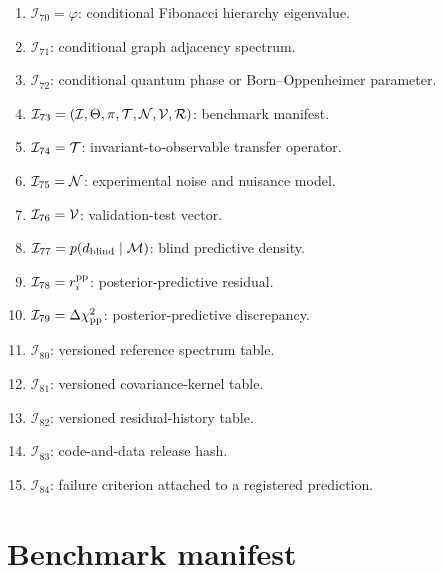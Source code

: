 \documentclass[
  aps,
  prd,
  reprint,
  superscriptaddress,
  nofootinbib,
  floatfix,
  longbibliography
]{revtex4-2}
\newcommand{\Inv}{\mathcal I}
\begin{document}
\begin{enumerate}
\item \(\Inv_{70}=\varphi\): conditional Fibonacci hierarchy eigenvalue.
\item \(\Inv_{71}\): conditional graph adjacency spectrum.
\item \(\Inv_{72}\): conditional quantum phase or Born--Oppenheimer parameter.

\item \(\Inv_{73}=({\cal I},\Theta,\pi,{\cal T},{\cal N},{\cal V},{\cal R})\):
benchmark manifest.
\item \(\Inv_{74}={\cal T}\): invariant-to-observable transfer operator.
\item \(\Inv_{75}={\cal N}\): experimental noise and nuisance model.
\item \(\Inv_{76}={\cal V}\): validation-test vector.
\item \(\Inv_{77}=p(d_{\rm blind}\mid{\cal M})\): blind predictive density.
\item \(\Inv_{78}=r_i^{\rm pp}\): posterior-predictive residual.
\item \(\Inv_{79}=\Delta\chi^2_{\rm pp}\): posterior-predictive discrepancy.
\item \(\Inv_{80}\): versioned reference spectrum table.
\item \(\Inv_{81}\): versioned covariance-kernel table.
\item \(\Inv_{82}\): versioned residual-history table.
\item \(\Inv_{83}\): code-and-data release hash.
\item \(\Inv_{84}\): failure criterion attached to a registered prediction.
\end{enumerate}


\section{Benchmark manifest}
\label{app:manifest}
\end{document}
